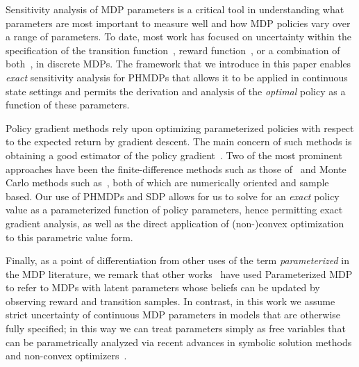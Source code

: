 Sensitivity analysis of MDP parameters is a critical tool in understanding what parameters are most important to measure well and how MDP policies vary over a range of parameters.  To date, most work has focused on uncertainty within the specification of the transition function~\parencite{Kalyanasundaram_AJC_2004}, reward function~\parencite{Tan_JAP_2011, Hopp_JOTA_1988}, or a combination of both~\parencite{Givan_AI_2000}, in discrete MDPs. The framework that we introduce in this paper enables \textit{exact} sensitivity analysis for PHMDPs that allows it to be applied in continuous state settings and permits the derivation and analysis of the \emph{optimal} policy as a function of these parameters.

Policy gradient methods rely upon optimizing parameterized policies with respect to the expected return by gradient descent. The main
concern of such methods is obtaining a good estimator of the policy gradient~\parencite{Peters_IRS_2006}. Two of the most prominent
approaches have been the finite-difference methods such as those of~\parencite{Ng_UAI_2000} and Monte Carlo methods such as~\parencite{Sutton_NIPS_1999,Baxter_ISCAS_2000}, both of which are numerically oriented and sample based. Our use of PHMDPs and SDP allows for us to solve for an \emph{exact} policy value as a parameterized function of policy parameters, hence permitting exact gradient analysis, as well as the direct application of (non-)convex optimization to this parametric value form.

Finally, as a point of differentiation from other uses of the term \emph{parameterized} in the MDP literature, we remark that other works~\parencite{Duff_UMA_2002,Dearden_UAI_1999,Gopalan_COLT_2015} have used Parameterized MDP to refer to MDPs with latent parameters whose beliefs can be updated by observing reward and transition samples. In contrast, in this work we assume strict uncertainty of continuous MDP parameters in models that are otherwise fully specified; in this way we can treat parameters simply as free variables that can be parametrically analyzed via recent advances in symbolic solution methods and non-convex optimizers~\parencite{Gao2013}.


